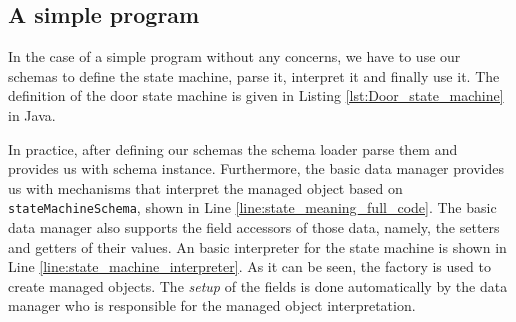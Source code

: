 \subsection{A simple program}
In the case of a simple program without any concerns, we have to use our schemas to define the state machine, parse it, interpret it and finally use it.
The definition of the door state machine is given in Listing \ref{lst:Door_state_machine} in Java.

In practice, after defining our schemas the schema loader parse them and provides us with schema instance. 
Furthermore, the basic data manager provides us with mechanisms that interpret the managed object based on \texttt{stateMachineSchema}, shown in Line \ref{line:state_meaning_full_code}.
The basic data manager also supports the field accessors of those data, namely, the setters and getters of their values.
An basic interpreter for the state machine is shown in Line \ref{line:state_machine_interpreter}.
As it can be seen, the factory is used to create managed objects.
The \textit{setup} of the fields is done automatically by the data manager who is responsible for the managed object interpretation.

